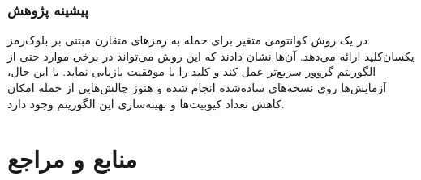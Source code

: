 \documentclass[xcolor=dvipsnames, professionalfonts, aspectratio=169, 11pt]{beamer}
\begin{document}
\begin{frame}
    \frametitle{پیشینه پژوهش}
    \begin{moredi}
        \item در \cite{zhang2022variational} یک روش کوانتومی متغیر برای حمله به رمزهای متقارن مبتنی بر بلوک‌رمز یکسان‌کلید ارائه می‌دهد. آن‌ها نشان دادند که این روش می‌تواند در برخی موارد حتی از الگوریتم گروور سریع‌تر عمل کند و کلید را با موفقیت بازیابی نماید. با این حال، آزمایش‌ها روی نسخه‌های ساده‌شده انجام شده و هنوز چالش‌هایی از جمله امکان کاهش تعداد کیوبیت‌ها و بهینه‌سازی این الگوریتم وجود دارد.    
    \end{moredi}
\end{frame}

\section{منابع و مراجع}
\begin{frame}
    \begin{latin}
        \scriptsize
        
    \end{latin}

\end{frame}
\end{document}
